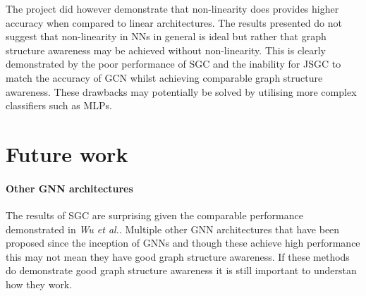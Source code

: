 The project did however demonstrate that non-linearity does provides higher accuracy when compared to linear architectures.
The results presented do not suggest that non-linearity in NNs in general is ideal but rather that graph structure awareness may be achieved without non-linearity.
This is clearly demonstrated by the poor performance of SGC and the inability for JSGC to match the accuracy of GCN whilst achieving comparable graph structure awareness.
These drawbacks may potentially be solved by utilising more complex classifiers such as MLPs.

%
%

\section{Future work}
\paragraph{Other GNN architectures}
The results of SGC are surprising given the comparable performance demonstrated in \textit{Wu et al.}\cite{wu2019simplifying}.
Multiple other GNN architectures that have been proposed since the inception of GNNs and though these achieve high performance this may not mean they have good graph structure awareness.
If these methods do demonstrate good graph structure awareness it is still important to understan how they work.

